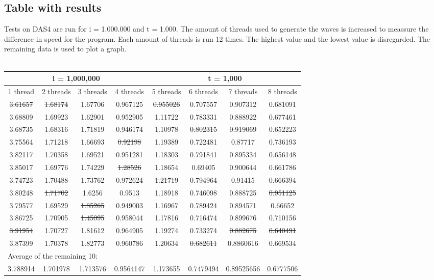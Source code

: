 \documentclass[a4paper]{article}
\begin{document}
  \subsection{Table with results}
    Tests on DAS4 are run for i = 1.000.000 and t = 1.000.
    The amount of threads used to generate the waves is increased to meassure the
    difference in speed for the program.
    Each amount of threads is run 12 times. 
    The highest value and the lowest value is disregarded. 
    The remaining data is used to plot a graph.\\\\
    \begin{tabular}{| c | c | c | c | c | c | c | c |}
      \hline
      \multicolumn{4}{|c}{i = 1,000,000} & \multicolumn{4}{c|}{t = 1,000}\\
      \hline
      1 thread & 2 threads & 3 threads & 4 threads & 5 threads & 6 threads & 7 threads & 8 threads\\
      \hline
      \st{3.61657} & \st{1.68174} & 1.67706 & 0.967125 & \st{0.955026} & 0.707557 & 0.907312 & 0.681091\\
      \hline
      3.68809 & 1.69923 & 1.62901 & 0.952905 & 1.11722 & 0.783331 & 0.888922 & 0.677461\\
      \hline
      3.68735 & 1.68316 & 1.71819 & 0.946174 & 1.10978 & \st{0.802315} & \st{0.919069} & 0.652223\\
      \hline
      3.75564 & 1.71218 & 1.66693 & \st{0.92198} & 1.19389 & 0.722481 & 0.87717 & 0.736193\\
      \hline
      3.82117 & 1.70358 & 1.69521 & 0.951281 & 1.18303 & 0.791841 & 0.895334 & 0.656148\\
      \hline
      3.85017 & 1.69776 & 1.74229 & \st{1.28526} & 1.18654 & 0.69405 & 0.900644 & 0.661786\\
      \hline
      3.74723 & 1.70488 & 1.73762 & 0.972624 & \st{1.21719} & 0.794964 & 0.91415 & 0.666394\\
      \hline
      3.80248 & \st{1.71702} & 1.6256 & 0.9513 & 1.18918 & 0.746098 & 0.888725 & \st{0.951125}\\
      \hline
      3.79577 & 1.69529 & \st{1.85265} & 0.949003 & 1.16967 & 0.789424 & 0.894571 & 0.66652\\
      \hline
      3.86725 & 1.70905 & \st{1.45095} & 0.958044 & 1.17816 & 0.716474 & 0.899676 & 0.710156\\
      \hline
      \st{3.91954} & 1.70727 & 1.81612 & 0.964905 & 1.19274 & 0.733274 & \st{0.882675} & \st{0.640491}\\
      \hline
      3.87399 & 1.70378 & 1.82773 & 0.960786 & 1.20634 & \st{0.682611} & 0.8860616 & 0.669534\\
      \hline
      \multicolumn{8}{|l|}{Average of the remaining 10:}\\
      \hline
      3.788914 & 1.701978 & 1.713576 & 0.9564147 & 1.173655 & 0.7479494 & 0.89525656 & 0.6777506\\
      \hline
    \end{tabular}
\end{document}
